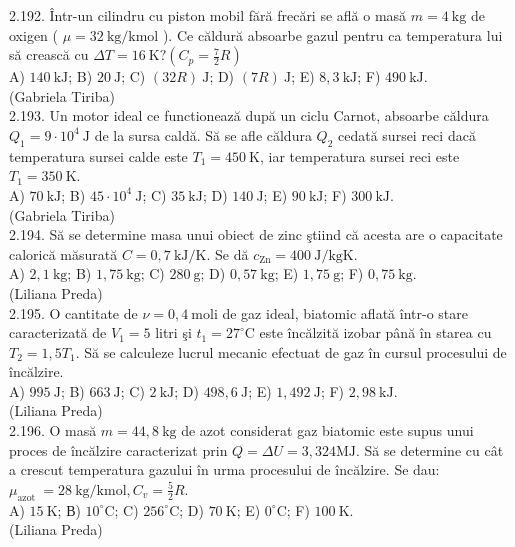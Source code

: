 \documentclass[10pt]{article}
\begin{document}
2.192. Într-un cilindru cu piston mobil fără frecări se află o masă $m=4 \mathrm{~kg}$ de oxigen ( $\mu=32 \mathrm{~kg} / \mathrm{kmol}$ ). Ce căldură absoarbe gazul pentru ca temperatura lui să crească cu $\Delta T=16 \mathrm{~K} ?\left(C_{p}=\frac{7}{2} R\right)$\\ A) $140 \mathrm{~kJ}$; B) $20 \mathrm{~J}$; C) $(32 R) \mathrm{~J}$; D) $(7 R) \mathrm{~J}$; E) $8,3 \mathrm{~kJ}$; F) $490 \mathrm{~kJ}$.\\ (Gabriela Tiriba)\\

2.193. Un motor ideal ce functionează după un ciclu Carnot, absoarbe căldura $Q_{1}=9 \cdot 10^{4} \mathrm{~J}$ de la sursa caldă. Să se afle căldura $Q_{2}$ cedată sursei reci dacă temperatura sursei calde este $T_{1}=450 \mathrm{~K}$, iar temperatura sursei reci este $T_{1}=350 \mathrm{~K}$.\\ A) $70 \mathrm{~kJ}$; B) $45 \cdot 10^{4} \mathrm{~J}$; C) $35 \mathrm{~kJ}$; D) $140 \mathrm{~J}$; E) $90 \mathrm{~kJ}$; F) $300 \mathrm{~kJ}$.\\ (Gabriela Tiriba)\\

2.194. Să se determine masa unui obiect de zinc ştiind că acesta are o capacitate calorică măsurată $C=0,7 \mathrm{~kJ} / \mathrm{K}$. Se dă $c_{\mathrm{Zn}}=400 \mathrm{~J} / \mathrm{kgK}$.\\ A) $2,1 \mathrm{~kg}$; B) $1,75 \mathrm{~kg}$; C) $280 \mathrm{~g}$; D) $0,57 \mathrm{~kg}$; E) $1,75 \mathrm{~g}$; F) $0,75 \mathrm{~kg}$.\\ (Liliana Preda)\\

2.195. O cantitate de $\nu=0,4 \mathrm{~moli}$ de gaz ideal, biatomic aflată într-o stare caracterizată de $V_{1}=5$ litri şi $t_{1}=27^{\circ} \mathrm{C}$ este încălzită izobar până în starea cu $T_{2}=1,5 T_{1}$. Să se calculeze lucrul mecanic efectuat de gaz în cursul procesului de încălzire.\\ A) $995 \mathrm{~J}$; B) $663 \mathrm{~J}$; C) $2 \mathrm{~kJ}$; D) $498,6 \mathrm{~J}$; E) $1,492 \mathrm{~J}$; F) $2,98 \mathrm{~kJ}$.\\ (Liliana Preda)\\

2.196. O masă $m=44,8 \mathrm{~kg}$ de azot considerat gaz biatomic este supus unui proces de încălzire caracterizat prin $Q=\Delta U=3,324 \mathrm{MJ}$. Să se determine cu cât a crescut temperatura gazului în urma procesului de încălzire. Se dau: $\mu_{\text {azot }}=28 \mathrm{~kg} / \mathrm{kmol}, C_{v}=\frac{5}{2} R$.\\ A) $15 \mathrm{~K}$; В) $10^{\circ} \mathrm{C}$; C) $256^{\circ} \mathrm{C}$; D) $70 \mathrm{~K}$; E) $0^{\circ} \mathrm{C}$; F) $100 \mathrm{~K}$.\\ (Liliana Preda)\\
\end{document}
